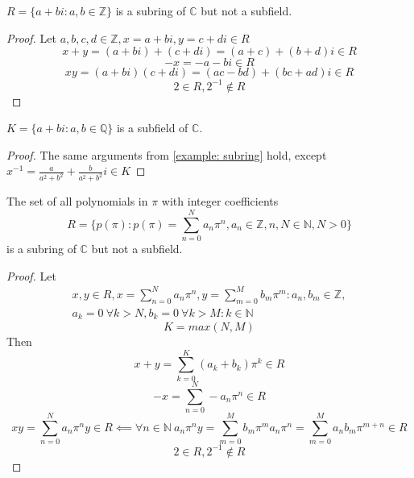 \documentclass{book}
\begin{document}
    \begin{examples}
    \begin{example} \label{example: subring}
        \(R = \{a + bi : a,b \in \mathbb{Z}\}\) is a subring of \(\mathbb{C}\) but not a subfield.
    \end{example}
    \begin{proof}
        Let \(a,b,c,d \in \mathbb{Z}, x = a + bi, y = c + di \in R\)
        \[x + y = (a + bi) + (c + di) = (a + c) + (b + d)i \in R\]
        \[-x = -a - bi \in R\]
        \[xy = (a + bi)(c + di) = (ac - bd) + (bc + ad)i \in R\]
        \[2 \in R, 2^{-1} \notin R\]
    \end{proof}

    \begin{example}
        \(K = \{a + bi : a,b \in \mathbb{Q}\}\) is a subfield of \(\mathbb{C}\).
    \end{example}
    \begin{proof}
        The same arguments from \cref{example: subring} hold, except
        \(x^{-1} = \frac{a}{a^2 + b^2} + \frac{b}{a^2 + b^2}i \in K\)
    \end{proof}

    \begin{example} \label{example: polynomials in pi with integer coefficients}
        The set of all polynomials in \(\pi\) with integer coefficients
        \[R = \{p(\pi) : p(\pi) = \sum_{n = 0}^N a_n\pi^n,a_n \in \mathbb{Z},n,N \in \mathbb{N},N > 0\}\] 
        is a subring of \(\mathbb{C}\) but not a subfield.
    \end{example}
    \begin{proof}
        Let 
        \begin{equation*}
        \begin{split}
            x, y \in R, 
            x = \sum_{n = 0}^N a_n\pi^n, 
            y = \sum_{m = 0}^M b_m\pi^m
             : a_n,b_m \in \mathbb{Z},\\
            a_k = 0\ \forall k > N,
            b_k = 0\ \forall k > M : k \in \mathbb{N}
        \end{split}
        \end{equation*}
        \[K = max(N, M)\]
        Then
        \[x + y = \sum_{k = 0}^K (a_k + b_k)\pi^k \in R\]
        \[-x = \sum_{n = 0}^N -a_n\pi^n \in R\]
        \[
            xy = \sum_{n = 0}^N a_n\pi^ny \in R \impliedby
            \forall n \in \mathbb{N} \ a_n\pi^ny = 
            \sum_{m = 0}^M b_m\pi^ma_n\pi^n = 
            \sum_{m = 0}^M a_nb_m\pi^{m + n} \in R
        \]
        \[2 \in R, 2^{-1} \notin R\]
    \end{proof}


\end{examples}
\end{document}
